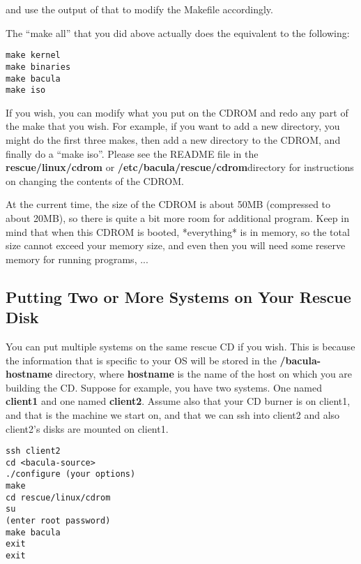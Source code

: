 and use the output of that to modify the Makefile accordingly. 

The ``make all'' that you did above actually does the equivalent to the
following: 

\footnotesize
\begin{verbatim}
make kernel
make binaries
make bacula
make iso
\end{verbatim}
\normalsize

If you wish, you can modify what you put on the CDROM and redo any part of the
make that you wish. For example, if you want to add a new directory, you might
do the first three makes, then add a new directory to the CDROM, and finally
do a ``make iso''. Please see the README file in the {\bf rescue/linux/cdrom}
or {\bf /etc/bacula/rescue/cdrom}directory for instructions on changing the
contents of the CDROM. 

At the current time, the size of the CDROM is about 50MB (compressed to about
20MB), so there is quite a bit more room for additional program. Keep in mind
that when this CDROM is booted, *everything* is in memory, so the total size
cannot exceed your memory size, and even then you will need some reserve
memory for running programs, ... 
\label{twosystemcd}

\subsection*{Putting Two or More Systems on Your Rescue Disk}

You can put multiple systems on the same rescue CD if you wish. This is
because the information that is specific to your OS will be stored in the {\bf
/bacula-hostname} directory, where {\bf hostname} is the name of the host on
which you are building the CD. Suppose for example, you have two systems. One
named {\bf client1} and one named {\bf client2}. Assume also that your CD
burner is on client1, and that is the machine we start on, and that we can ssh
into client2 and also client2's disks are mounted on client1. 

\footnotesize
\begin{verbatim}
ssh client2
cd <bacula-source>
./configure (your options)
make
cd rescue/linux/cdrom
su
(enter root password)
make bacula
exit
exit
\end{verbatim}
\normalsize

